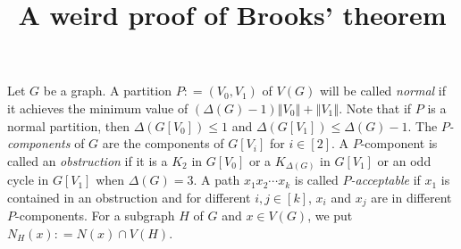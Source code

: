 \documentclass[12pt]{amsart}
\title{A weird proof of Brooks' theorem}
\theoremstyle{plain}
\theoremstyle{definition}
\theoremstyle{remark}
\newcommand{\size}[1]{\left\Vert#1\right\Vert}
\newcommand{\irange}[1]{\left[#1\right]}
\newcommand{\DefinedAs}{\mathrel{\mathop:}=}
\begin{document}
\maketitle

Let $G$ be a graph.  A partition $P \DefinedAs (V_0, V_1)$ of $V(G)$ will be
called \emph{normal} if it achieves the minimum value of $(\Delta(G) - 1)\size{V_0} + \size{V_1}$.  Note that if $P$ is a normal partition, then
$\Delta(G[V_0]) \leq 1$ and $\Delta(G[V_1]) \leq \Delta(G) - 1$.  
The \emph{$P$-components} of $G$ are the components of $G[V_i]$ for $i \in
\irange{2}$.  A $P$-component is called an \emph{obstruction} if it is a
$K_2$ in $G[V_0]$ or a $K_{\Delta(G)}$ in $G[V_1]$ or an odd cycle in $G[V_1]$ when
$\Delta(G) = 3$.  A path $x_1x_2\cdots x_k$ is called \emph{$P$-acceptable} if
$x_1$ is contained in an obstruction and for different $i, j \in \irange{k}$, $x_i$ and
$x_j$ are in different $P$-components.  For a subgraph $H$ of $G$ and $x \in V(G)$, 
we put $N_H(x) \DefinedAs N(x) \cap V(H)$.
\end{document}
